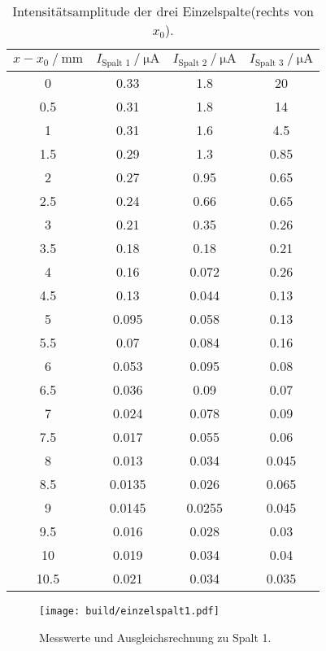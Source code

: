 \begin{table}[h]
  \centering
    \begin{tabular}{S S S S}
      \toprule
      {$x-x_0 \:/\: \si{\milli\meter}$} & {$I_\text{Spalt 1}\:/\:\si{\micro\ampere}$} & {$I_\text{Spalt 2}\:/\:\si{\micro\ampere}$}
      & {$I_\text{Spalt 3}\:/\:\si{\micro\ampere}$}\\
       & 0.33 & 1.8 & 20\\
      0.5 & 0.31 & 1.8 & 14\\
      1 & 0.31 & 1.6 & 4.5\\
      1.5 & 0.29 & 1.3 & 0.85\\
      2 & 0.27 & 0.95 & 0.65\\
      2.5 & 0.24 & 0.66 & 0.65\\
      3 & 0.21 & 0.35 & 0.26\\
      3.5 & 0.18 & 0.18 & 0.21\\
      4 & 0.16 & 0.072 & 0.26\\
      4.5 & 0.13 & 0.044 & 0.13\\
      5 & 0.095 & 0.058 & 0.13\\
      5.5 & 0.07 & 0.084 & 0.16\\
      6 & 0.053 & 0.095 & 0.08\\
      6.5 & 0.036 & 0.09 & 0.07\\
      7 & 0.024 & 0.078 & 0.09\\
      7.5 & 0.017 & 0.055 & 0.06\\
      8 & 0.013 & 0.034 & 0.045\\
      8.5 & 0.0135 & 0.026 & 0.065\\
      9 & 0.0145 & 0.0255 & 0.045\\
      9.5 & 0.016 & 0.028 & 0.03\\
      10 & 0.019 & 0.034 & 0.04\\
      10.5 & 0.021 & 0.034 & 0.035\\
      \bottomrule
    \end{tabular}
  \caption{Intensitätsamplitude der drei Einzelspalte(rechts von $x_0$).}
  \label{tab:einzelspalterechts}
\end{table}

\begin{figure}
  \centering
  \texttt{[image: build/einzelspalt1.pdf]}
  \caption{Messwerte und Ausgleichsrechnung zu Spalt 1.}
  \label{fig:einzelspalt1}
\end{figure}

